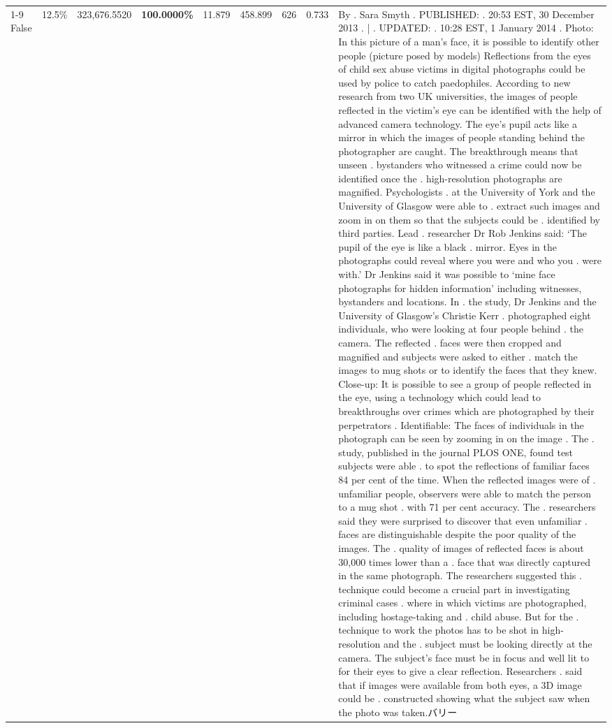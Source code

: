 \begin{table}[H]
\begin{tabular}{lllrlllll}
\cline{1-9}
False & 12.5\% & 323,676.5520 & \bfseries \color{red} 100.0000\% & 11.879 & 458.899 & 626 & 0.733 & By . Sara Smyth . PUBLISHED: . 20:53 EST, 30 December 2013 . | . UPDATED: . 10:28 EST, 1 January 2014 . Photo: In this picture of a man's face, it is possible to identify other people (picture posed by models) Reflections from the eyes of child sex abuse victims in digital photographs could be used by police to catch paedophiles. According to new research from two UK universities, the images of people reflected in the victim's eye can be identified with the help of advanced camera technology. The eye's pupil acts like a mirror in which the images of people standing behind the photographer are caught. The breakthrough means that unseen . bystanders who witnessed a crime could now be identified once the . high-resolution photographs are magnified. Psychologists . at the University of York and the University of Glasgow were able to . extract such images and zoom in on them so that the subjects could be . identified by third parties. Lead . researcher Dr Rob Jenkins said: ‘The pupil of the eye is like a black . mirror. Eyes in the photographs could reveal where you were and who you . were with.' Dr Jenkins said it was possible to ‘mine face photographs for hidden information' including witnesses, bystanders and locations. In . the study, Dr Jenkins and the University of Glasgow's Christie Kerr . photographed eight individuals, who were looking at four people behind . the camera. The reflected . faces were then cropped and magnified and subjects were asked to either . match the images to mug shots or to identify the faces that they knew. Close-up: It is possible to see a group of people reflected in the eye, using a technology which could lead to breakthroughs over crimes which are photographed by their perpetrators . Identifiable: The faces of individuals in the photograph can be seen by zooming in on the image . The . study, published in the journal PLOS ONE, found test subjects were able . to spot the reflections of familiar faces 84 per cent of the time. When the reflected images were of . unfamiliar people, observers were able to match the person to a mug shot . with 71 per cent accuracy. The . researchers said they were surprised to discover that even unfamiliar . faces are distinguishable despite the poor quality of the images. The . quality of images of reflected faces is about 30,000 times lower than a . face that was directly captured in the same photograph. The researchers suggested this . technique could become a crucial part in investigating criminal cases . where in which victims are photographed, including hostage-taking and . child abuse. But for the . technique to work the photos has to be shot in high-resolution and the . subject must be looking directly at the camera. The subject's face must be in focus and well lit to for their eyes to give a clear reflection. Researchers . said that if images were available from both eyes, a 3D image could be . constructed showing what the subject saw when the photo was taken.バリー \\

\end{tabular}
\end{table}
